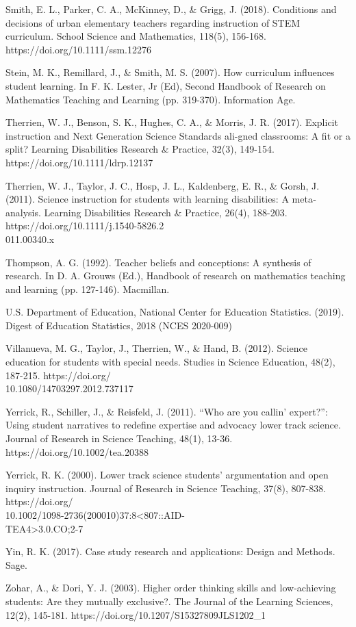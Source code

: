 \documentclass[11.5pt]{sig-alternate}
\begin{document}
\begin{large}
Smith, E. L., Parker, C. A., McKinney, D., \& Grigg, J. (2018). Conditions and decisions of urban elementary teachers regarding instruction of STEM curriculum. School Science and Mathematics, 118(5), 156-168. https://doi.org/10.1111/ssm.12276

Stein, M. K., Remillard, J., \& Smith, M. S. (2007). How curriculum influences student learning. In F. K. Lester, Jr (Ed), Second Handbook of Research on Mathematics Teaching and Learning (pp. 319-370). Information Age.

Therrien, W. J., Benson, S. K., Hughes, C. A., \& Morris, J. R. (2017). Explicit instruction and Next Generation Science Standards ali-gned classrooms: A fit or a split? Learning Disabilities Research \& Practice, 32(3), 149-154. https://doi.org/10.1111/ldrp.12137

Therrien, W. J., Taylor, J. C., Hosp, J. L., Kaldenberg, E. R., \& Gorsh, J. (2011). Science instruction for students with learning disabilities: A meta‐analysis. Learning Disabilities Research \& Practice, 26(4), 188-203. https://doi.org/10.1111/j.1540-5826.2\\011.00340.x

Thompson, A. G. (1992). Teacher beliefs and conceptions: A synthesis of research. In D. A. Grouws (Ed.), Handbook of research on mathematics teaching and learning (pp. 127-146). Macmillan.

U.S. Department of Education, National Center for Education Statistics. (2019). Digest of Education Statistics, 2018 (NCES 2020-009)

Villanueva, M. G., Taylor, J., Therrien, W., \& Hand, B. (2012). Science education for students with special needs. Studies in Science Education, 48(2), 187-215. https://doi.org/\\10.1080/14703297.2012.737117

Yerrick, R., Schiller, J., \& Reisfeld, J. (2011). “Who are you callin’ expert?”: Using student narratives to redefine expertise and advocacy lower track science. Journal of Research in Science Teaching, 48(1), 13-36. \\https://doi.org/10.1002/tea.20388

Yerrick, R. K. (2000). Lower track science students’ argumentation and open inquiry instruction. Journal of Research in Science Teaching, 37(8), 807-838. https://doi.org/\\10.1002/1098-2736(200010)37:8<807::AID-\\TEA4>3.0.CO;2-7

Yin, R. K. (2017). Case study research and applications: Design and Methods. Sage.

Zohar, A., \& Dori, Y. J. (2003). Higher order thinking skills and low-achieving students: Are they mutually exclusive?. The Journal of the Learning Sciences, 12(2), 145-181. https://doi.org/10.1207/S15327809JLS1202\_1

\end{large}
\end{document}
